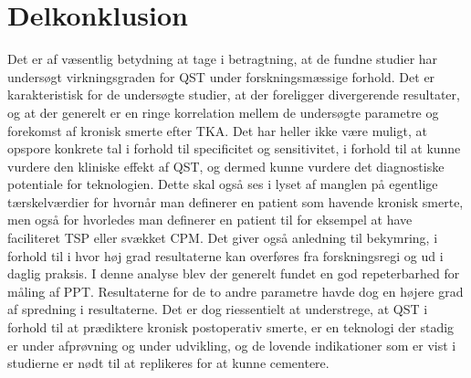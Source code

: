 \section{Delkonklusion}
Det er af væsentlig betydning at tage i betragtning, at de fundne studier har undersøgt virkningsgraden for QST under forskningsmæssige forhold. Det er karakteristisk for de undersøgte studier, at der foreligger divergerende resultater, og at der generelt er en ringe korrelation mellem de undersøgte parametre og forekomst af kronisk smerte efter TKA. Det har heller ikke være muligt, at opspore konkrete tal i forhold til specificitet og sensitivitet, i forhold til at kunne vurdere den kliniske effekt af QST, og dermed kunne vurdere det diagnostiske potentiale for teknologien. Dette skal også ses i lyset af manglen på egentlige tærskelværdier for hvornår man definerer en patient som havende kronisk smerte, men også for hvorledes man definerer en patient til for eksempel at have faciliteret TSP eller svækket CPM. Det giver også anledning til bekymring, i forhold til i hvor høj grad resultaterne kan overføres fra forskningsregi og ud i daglig praksis.
I denne analyse blev der generelt fundet en  god repeterbarhed for måling af PPT. Resultaterne for de to andre parametre havde dog en højere grad af spredning i resultaterne.
Det er dog riessentielt at understrege, at QST i forhold til at prædiktere kronisk postoperativ smerte, er en teknologi der stadig er under afprøvning og under udvikling, og de lovende indikationer som er vist i studierne er nødt til at replikeres  for at kunne cementere.



